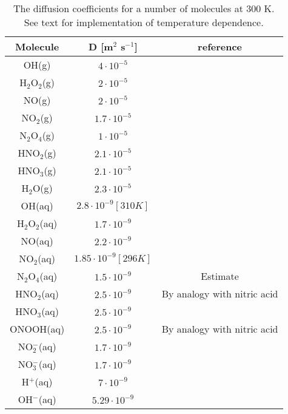     \begin{table}[htpb] %
        \begin{center}
            \begin{tabular}{c |c |c}\rmfamily
                Molecule & D [m$^2$ s$^{-1}$]& reference\\ \hline \hline
                OH(g) & $4\cdot10^{-5}$ & \cite{Sakiyama2012b}\\
                H$_2$O$_2$(g) & $2\cdot10^{-5}$ & \cite{Sakiyama2012b}\\
                NO(g) & $2\cdot10^{-5}$ & \cite{Sakiyama2012b}\\
                NO$_2$(g) & $1.7\cdot10^{-5}$ & \cite{Sakiyama2012b}\\
                N$_2$O$_4$(g) & $1\cdot10^{-5}$ & \cite{Sakiyama2012b}\\
                HNO$_2$(g) & $2.1\cdot10^{-5}$ & \cite{Sakiyama2012b}\\
                HNO$_3$(g) & $2.1\cdot10^{-5}$ & \cite{Sakiyama2012b}\\
                H$_2$O(g) & $2.3\cdot10^{-5}$ & \cite{Sakiyama2012b}\\
                OH(aq) & $2.8\cdot10^{-9} [310 K]$ & \cite{khalack2005solvation}\\
                H$_2$O$_2$(aq) & $1.7\cdot10^{-9}$ & \cite{mcmurtrie1948measurement}\\
                NO(aq) & $2.2\cdot10^{-9}$ & \cite{zacharia2005diffusivity}\\
                NO$_2$(aq) & $1.85\cdot10^{-9} [296 K]$ & \cite{skinn2013nitrogen}\\
                N$_2$O$_4$(aq) & $1.5\cdot10^{-9}$ & Estimate\\
                HNO$_2$(aq) & $2.5\cdot10^{-9}$ & By analogy with nitric acid\\
                HNO$_3$(aq) & $2.5\cdot10^{-9}$ & \cite{wills1971diffusion}\\
                ONOOH(aq) & $2.5\cdot10^{-9}$ & By analogy with nitric acid\\
                NO$^{-}_2$(aq) & $1.7\cdot10^{-9}$ & \cite{kreft2001individual}\\
                NO$^{-}_3$(aq) & $1.7\cdot10^{-9}$ & \cite{kreft2001individual}\\
                H$^{+}$(aq) & $7\cdot10^{-9}$ & \cite{agmon1995grotthuss}\\
                OH$^{-}$(aq) & $5.29\cdot10^{-9}$ & \cite{kitamura1994microchemistry}\\
            \end{tabular}
        \end{center}
        \caption{The diffusion coefficients for a number of molecules at 300 K. See text for implementation of temperature dependence.}
        \label{tab:diffusioncoef}
    \end{table}

